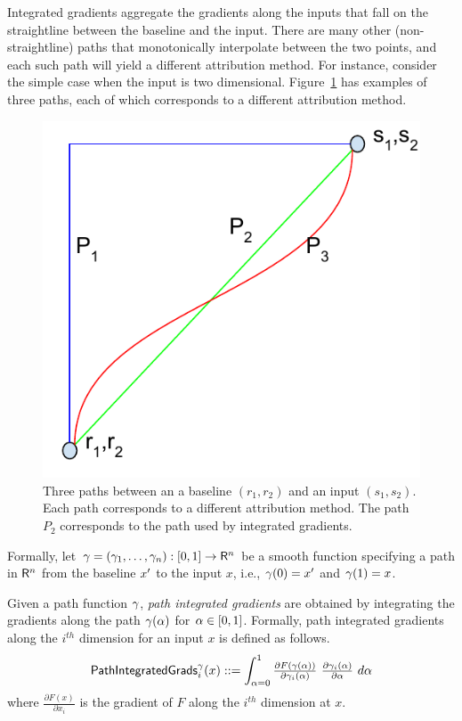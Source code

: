 Integrated gradients aggregate the gradients along the
inputs that fall on the straightline between the baseline and
the input. There are many other
(non-straightline) paths that monotonically interpolate between the
two points, and each such path will yield a different attribution method.  For instance,
consider the simple case when the input is two dimensional.
Figure~\ref{fig:three-paths} has examples of three paths, each of which corresponds to a different
attribution method.

\begin{figure}
  \centering
\includegraphics[width=0.5\columnwidth]{./Figures/Paths/integ.pdf}
  \caption{Three paths between an a baseline $(r_1, r_2)$ and an input $(s_1, s_2)$.
    Each path corresponds to a different attribution method. The path $P_2$ corresponds to the path used by integrated gradients.}
  \label{fig:three-paths}
\end{figure}

\newpage
Formally, let $\gamma = (\gamma_1, \ldots, \gamma_n): [0,1]
\rightarrow \mathsf{R}^n$ be a smooth function specifying a path in
$\mathsf{R}^n$ from the baseline $x'$ to the input $x$, i.e.,
$\gamma(0) = x'$ and $\gamma(1) = x$.

Given a path function $\gamma$, \emph{path integrated gradients} are obtained by
integrating the gradients along the path $\gamma(\alpha)$
for $\alpha \in [0,1]$. Formally, path
integrated gradients along the $i^{th}$ dimension for an input $x$
is defined as follows.
\begin{equation}
\mathsf{PathIntegratedGrads}^{\gamma}_i(x) ::= \int_{\alpha=0}^{1} \tfrac{\partial F(\gamma(\alpha))}{\partial \gamma_i(\alpha)  }~\tfrac{\partial \gamma_i(\alpha)}{\partial \alpha}  ~d\alpha
\end{equation}
where $\tfrac{\partial F(x)}{\partial x_i}$ is the gradient of
$F$ along the $i^{th}$ dimension at $x$.

